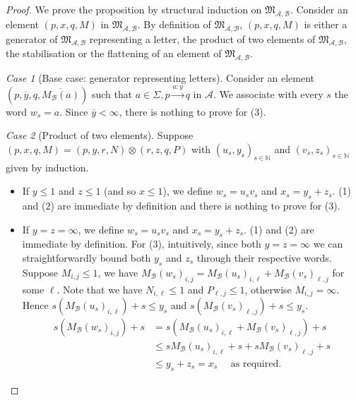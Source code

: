 \documentclass{lmcs}
\theoremstyle{remark}
\newtheorem{case}{Case}
\newcommand{\N}{\mathbb{N}}
\newcommand{\ideal}{\mathfrak{M}}
\newcommand{\autA}{\mathcal{A}}
\newcommand{\autB}{\mathcal{B}}
\theoremstyle{remark}
\begin{document}
\begin{proof}
We prove the proposition by structural induction on $\ideal_{\autA,\autB}$. Consider an element $(p,x,q,M)$ in $\ideal_{\autA,\autB}$. By definition of $\ideal_{\autA,\autB}$, $(p,x,q,M)$ is either a generator of $\ideal_{\autA,\autB}$ representing a letter, the product of two elements of $\ideal_{\autA,\autB}$, the stabilisation or the flattening of an element of $\ideal_{\autA,\autB}$.

\begin{case}[Base case: generator representing letters]
Consider an element $(p,\overline{y},q,\overline{M_\autB(a)})$ such that  $a\in \Sigma, p\xrightarrow{a:y}q \text{ in } \autA$. We associate with every $s$ the word $w_s = a$. Since $\overline{y} < \infty$, there is nothing to prove for (3).
\end{case}

\begin{case}[Product of two elements]

Suppose $(p,x,q,M) = (p,y,r,N)\otimes (r,z,q,P)$ with $(u_s,y_s)_{s\in\N}$ and $(v_s,z_s)_{s\in\N}$ given by induction. 
\begin{itemize}
\item If $y\le 1$ and $z\le 1$ (and so $x \le 1$), we define $w_s = u_sv_s$ and $x_s = y_s+z_s$. (1) and (2) are immediate by definition and there is nothing to prove for (3).

\item If $y=z=\infty$, we define $w_s = u_sv_s$ and $x_s = y_s+z_s$. (1) and (2) are immediate by definition. For (3), intuitively, since both $y=z=\infty$ we can straightforwardly bound both $y_s$ and $z_s$ through their respective words. Suppose $M_{i,j} \le 1$, we have $M_\autB(w_s)_{i,j} = M_\autB(u_s)_{i,\ell} + M_\autB(v_s)_{\ell,j}$ for some $\ell$.
Note that we have $N_{i,\ell} \le 1$ and $P_{\ell, j} \le 1$, otherwise $M_{i,j} = \infty$. Hence $s(M_\autB(u_s)_{i,\ell})+ s \le y_s$ and $s(M_\autB(v_s)_{\ell,j})+ s \le y_s$.
\begin{align*}
s(M_\autB(w_s)_{i,j}) + s & = s(M_\autB(u_s)_{i,\ell} + M_\autB(v_s)_{\ell,j} ) + s
\\ &\le  sM_\autB(u_s)_{i,\ell} + s +  sM_\autB(v_s)_{\ell,j} + s
\\&\le y_s + z_s  = x_s \quad \text{ as required.}
\end{align*}


\end{itemize}
\end{case}
\end{proof}
\end{document}
